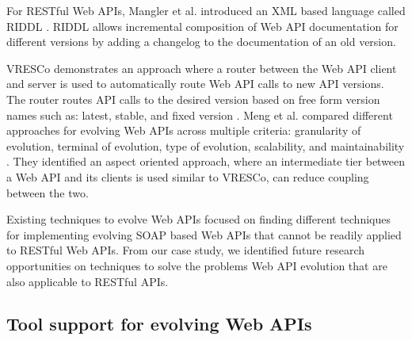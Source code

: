 \documentclass[conference]{IEEEtran}
\begin{document}
For RESTful Web APIs, Mangler et al. introduced an XML based language called RIDDL \cite{mangler2010origin}. RIDDL allows incremental composition of Web API documentation for different versions by adding a changelog to the documentation of an old version.

VRESCo demonstrates an approach where a router between the Web API client and server is used to automatically route Web API calls to new API versions. The router routes API calls to the desired version based on free form version names such as: latest, stable, and fixed version \cite{leitner2008end}. Meng et al. compared different approaches for evolving Web APIs across multiple criteria: granularity of evolution, terminal of evolution, type of evolution, scalability, and maintainability \cite{6835564}. They identified an aspect oriented approach, where an intermediate tier between a Web API and its clients is used similar to VRESCo, can reduce coupling between the two.

Existing techniques to evolve Web APIs focused on finding different techniques for implementing evolving SOAP based Web APIs that cannot be readily applied to RESTful Web APIs. From our case study, we identified future research opportunities on techniques to solve the problems Web API evolution that are also applicable to RESTful APIs.

\subsection{Tool support for evolving Web APIs} %
\label{sub:tool_development}

\end{document}
